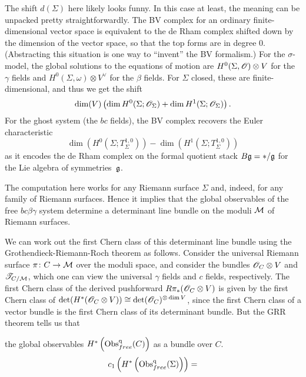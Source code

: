 \begin{rmk}
The shift $d(\Sigma)$ here likely looks funny.
In this case at least, the meaning can be unpacked pretty straightforwardly. 
The BV complex for an ordinary finite-dimensional vector space is equivalent to the de Rham complex shifted down by the dimension of the vector space, 
so that the top forms are in degree 0.
(Abstracting this situation is one way to ``invent'' the BV formalism.)
For the $\sigma$-model, the global solutions to the equations of motion are $H^0(\Sigma,\mathscr O) \otimes V$ for the $\gamma$ fields and $H^0(\Sigma,\omega) \otimes V^\vee$ for the $\beta$ fields.
For $\Sigma$ closed, these are finite-dimensional, and thus we get the shift
\[
 \dim (V)  \left(\dim H^0(\Sigma ; \mathscr O_\Sigma) + \dim H^1(\Sigma ; \mathscr O_\Sigma)\right).
\]
For the ghost system (the $bc$ fields), 
the BV complex recovers the Euler characteristic 
\[
\dim(H^0(\Sigma ; T_\Sigma^{1,0})) - \dim(H^1(\Sigma ; T_\Sigma^{1,0}))
\]
as it encodes the de Rham complex on the formal quotient stack $B\mathfrak g = \ast/\mathfrak g$ for the Lie algebra of symmetries~$\mathfrak g$.
\end{rmk}

The computation here works for any Riemann surface $\Sigma$ and, indeed, for any family of Riemann surfaces.
Hence it implies that the global observables of the free $bc\beta\gamma$ system determine a determinant line bundle on the moduli $\mathcal M$ of Riemann surfaces.

We can work out the first Chern class of this determinant line bundle using the Grothendieck-Riemann-Roch theorem as follows.
Consider the universal Riemann surface $\pi \colon C \to \mathcal M$ over the moduli space, 
and consider the bundles $\mathscr O_C \otimes V$ and $\mathscr T_{C/\mathcal M}$,
which one can view the universal $\gamma$ fields and $c$ fields, respectively.
The first Chern class of the derived pushforward $R\pi_*(\mathscr O_C \otimes V)$ is given by the first Chern class of $\det(H^*(\mathscr O_C \otimes V)) \cong \det(\mathscr O_C)^{\otimes \dim V}$, 
since the first Chern class of a vector bundle is the first Chern class of its determinant bundle.
But the GRR theorem tells us that 

the global observables $H^*\left({\rm Obs}^{\rm q}_{free}(C)\right)$ as a bundle over $C$.
\[
c_1\left(H^*\left({\rm Obs}^{\rm q}_{free}(\Sigma)\right)\right) = 
\]


